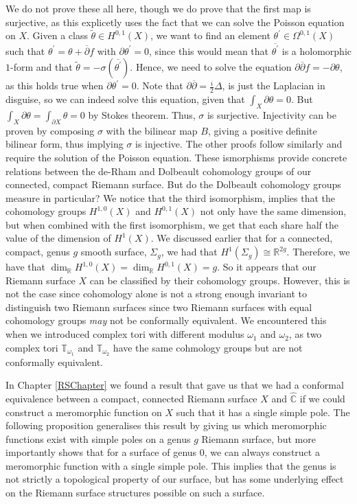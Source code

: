 \documentclass[11pt]{report}
\theoremstyle{definition}
\newenvironment{sproof}{%
  \renewcommand{\proofname}{Sketch Proof}\proof}{\endproof}
\begin{document}
\begin{sproof}
  We do not prove these all here, though we do prove that the first map is surjective, as this explicetly uses the fact that we can solve the Poisson equation on $X$. Given a class $\tilde{\theta} \in H^{0,1}(X)$, we want to find an element  $\theta^{\prime} \in \Omega^{0,1}(X)$ such that $\theta^{\prime} = \theta + \overline{\partial}f$ with $\partial \theta^{\prime} = 0$, since this would mean that $\overline{\theta^{\prime}}$ is a holomorphic $1$-form and that $\tilde{\theta} = -\sigma(\overline{\theta^{\prime}})$. Hence, we need to solve the equation $\partial\overline{\partial}f = -\partial \theta$, as this holds true when $\partial\theta^{\prime}=0$. Note that $\partial\overline{\partial} = \frac{i}{2}\Delta$, is just the Laplacian in disguise, so we can indeed solve this equation, given that $\int_X\partial \theta = 0$. But $\int_X\partial \theta = \int_{\partial X}\theta = 0$ by Stokes theorem. Thus, $\sigma$ is surjective. Injectivity can be proven by composing $\sigma$ with the bilinear map $B$, giving a positive definite bilinear form, thus implying $\sigma$ is injective. 
  The other proofs follow similarly and require the solution of the Poisson equation.
\end{sproof}
These ismorphisms provide concrete relations between the de-Rham and Dolbeault cohomology groups of our connected, compact Riemann surface. But do the Dolbeault cohomology groups measure in particular? We notice that the third isomorphism, implies that the cohomology groups $H^{1,0}(X)$ and $H^{0,1}(X)$ not only have the same dimension, but when combined with the first isomorphism, we get that each share half the value of the dimension of $H^1(X)$. We discussed earlier that for a connected, compact, genus $g$ smooth surface, $\Sigma_g$, we had that $H^1(\Sigma_g)\cong\mathbb{R}^{2g}$. Therefore, we have that $\dim_{\mathbb{R}}H^{1,0}(X)=\dim_{\mathbb{R}}H^{0,1}(X)=g$. So it appears that our Riemann surface $X$ can be classified by their cohomology groups. However, this is not the case since cohomology alone is not a strong enough invariant to distinguish two Riemann surfaces since two Riemann surfaces with equal cohomology groups \emph{may} not be conformally equivalent. We encountered this when we introduced complex tori with different modulus $\omega_1$ and $\omega_2$, as two complex tori $\mathbb{T}_{\omega_1}$ and $\mathbb{T}_{\omega_2}$ have the same cohmology groups but are not conformally equivalent.

In Chapter \ref{RSChapter} we found a result that gave us that we had a conformal equivalence between a compact, connected Riemann surface $X$ and $\widehat{\mathbb{C}}$ if we could construct a meromorphic function on $X$ such that it has a single simple pole. The following proposition generalises this result by giving us which meromorphic functions exist with simple poles on a genus $g$ Riemann surface, but more importantly shows that for a surface of genus $0$, we can always construct a meromorphic function with a single simple pole. This implies that the genus is not strictly a topological property of our surface, but has some underlying effect on the Riemann surface structures possible on such a surface.
\end{document}
